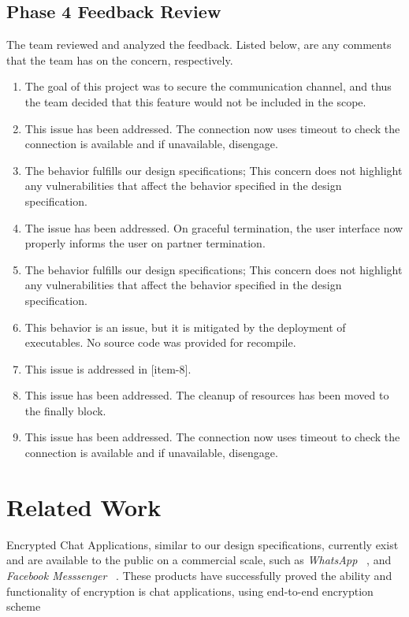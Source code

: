 \documentclass[sigconf]{acmart}
\begin{document}
\subsection{Phase 4 Feedback Review}
The team reviewed and analyzed the feedback. Listed below, are any comments that
the team has on the concern, respectively.
\begin{enumerate}
	\item The goal of this project was to secure the communication channel,
	      and thus the team decided that this feature would not be included in
	      the scope.
	\item This issue has been addressed. The connection now uses timeout to
	      check the connection is available and if unavailable, disengage.
	\item The behavior fulfills our design specifications; This concern does not
	      highlight any vulnerabilities that affect the behavior specified in
	      the design specification.
	\item The issue has been addressed. On graceful termination, the user
	      interface now properly informs the user on partner termination.
	\item The behavior fulfills our design specifications; This concern does not
	      highlight any vulnerabilities that affect the behavior specified in
	      the design specification.
	\item This behavior is an issue, but it is mitigated by the deployment of
	      executables. No source code was provided for recompile.
	\item This issue is addressed in [item-8].
	\item This issue has been addressed. The cleanup of resources has been moved
	      to the finally block.
	\item This issue has been addressed. The connection now uses timeout to
	      check the connection is available and if unavailable, disengage.
\end{enumerate}


\section{Related Work}
Encrypted Chat Applications, similar to our design specifications, currently
exist and are available to the public on a commercial scale, such as
\textit{WhatsApp} ~\cite{WhatsAppEncryption}, and \textit{Facebook Messsenger}
~\cite{FacebookMessengerEncryption}. These products have successfully proved
the ability and functionality of encryption is chat applications, using
end-to-end encryption scheme ~\cite{WhatsAppEncryption}
~\cite{FacebookMessengerEncryption}
\end{document}
